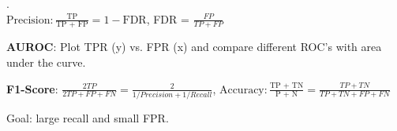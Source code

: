 .\\[-20pt]
$\text{Precision}: \frac{\text{TP}}{\text{TP + FP}} = 1 - \text{FDR}$, FDR = $\frac{FP}{TP + FP}$

\textbf{AUROC}: Plot TPR (y) vs. FPR (x) and compare different ROC's with area under the curve.

\textbf{F1-Score}: $\frac{2TP}{2TP+FP+FN}=\frac{2}{1/Precision+1/Recall}$, $\text{Accuracy}: \frac{\text{TP + TN}}{\text{P + N}} = \frac{TP + TN}{TP + TN + FP + FN}$

Goal: large recall and small FPR.

